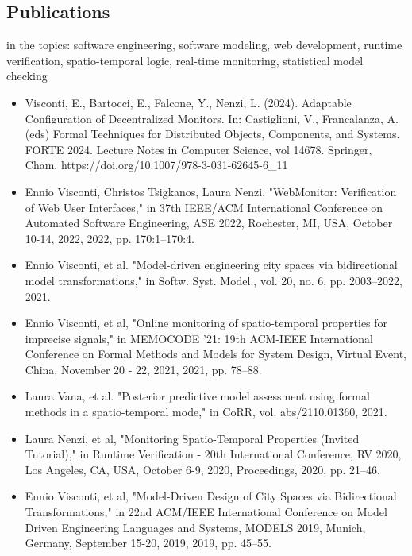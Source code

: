 \documentclass[10pt,a4paper,sans]{moderncv}        %
\begin{document}



\subsection{Publications}

{in the topics: software engineering, software modeling, web development, runtime verification, spatio-temporal logic, real-time monitoring, statistical model checking}{}{
\begin{itemize}
    \item Visconti, E., Bartocci, E., Falcone, Y., Nenzi, L. (2024). Adaptable Configuration of Decentralized Monitors. In: Castiglioni, V., Francalanza, A. (eds) Formal Techniques for Distributed Objects, Components, and Systems. FORTE 2024. Lecture Notes in Computer Science, vol 14678. Springer, Cham. https://doi.org/10.1007/978-3-031-62645-6\_11
    \item Ennio Visconti, Christos Tsigkanos, Laura Nenzi, "WebMonitor: Verification of Web User Interfaces," in 37th IEEE/ACM International Conference on Automated Software Engineering, ASE 2022, Rochester, MI, USA, October 10-14, 2022, 2022, pp. 170:1–170:4.
    \item Ennio Visconti, et al. "Model-driven engineering city spaces via bidirectional model transformations," in Softw. Syst. Model., vol. 20, no. 6, pp. 2003–2022, 2021.
    \item Ennio Visconti, et al, "Online monitoring of spatio-temporal properties for imprecise signals," in MEMOCODE '21: 19th ACM-IEEE International Conference on Formal Methods and Models for System Design, Virtual Event, China, November 20 - 22, 2021, 2021, pp. 78–88.
    \item Laura Vana, et al. "Posterior predictive model assessment using formal methods in a spatio-temporal mode," in CoRR, vol. abs/2110.01360, 2021.
    \item Laura Nenzi, et al, "Monitoring Spatio-Temporal Properties (Invited Tutorial)," in Runtime Verification - 20th International Conference, RV 2020, Los Angeles, CA, USA, October 6-9, 2020, Proceedings, 2020, pp. 21–46.
    \item Ennio Visconti, et al, "Model-Driven Design of City Spaces via Bidirectional Transformations," in 22nd ACM/IEEE International Conference on Model Driven Engineering Languages and Systems, MODELS 2019, Munich, Germany, September 15-20, 2019, 2019, pp. 45–55.
\end{itemize}
}



\end{document}
